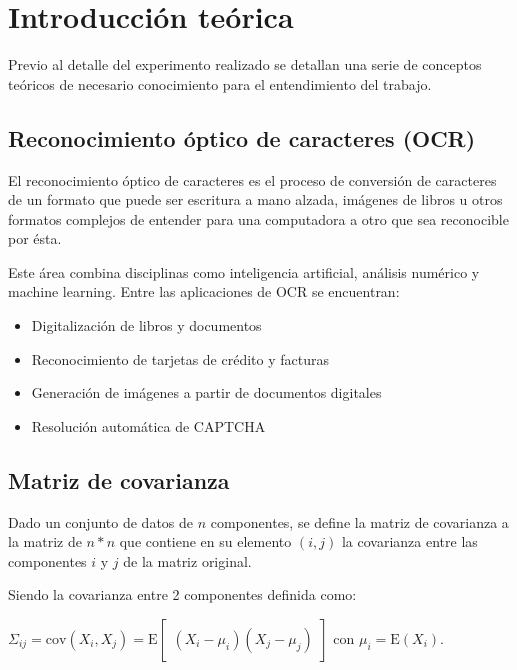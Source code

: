     \section{Introducci\'on te\'orica}

Previo al detalle del experimento realizado se detallan una serie de conceptos te\'oricos de necesario
conocimiento para el entendimiento del trabajo.

\subsection{Reconocimiento \'optico de caracteres (OCR)}

El reconocimiento \'optico de caracteres es el proceso de conversi\'on de caracteres de un formato que puede
ser escritura a mano alzada, im\'agenes de libros u otros formatos complejos de entender para una computadora
a otro que sea reconocible por \'esta.

Este \'area combina disciplinas como inteligencia artificial, an\'alisis num\'erico y machine learning. Entre
las aplicaciones de OCR se encuentran:

\begin{itemize}
  \item Digitalizaci\'on de libros y documentos
  \item Reconocimiento de tarjetas de cr\'edito y facturas
  \item Generaci\'on de im\'agenes a partir de documentos digitales
  \item Resoluci\'on autom\'atica de CAPTCHA
\end{itemize}

\subsection{Matriz de covarianza}

Dado un conjunto de datos de $n$ componentes, se define la matriz de covarianza a la matriz de $n*n$ que
contiene en su elemento $(i, j)$ la covarianza entre las componentes $i$ y $j$ de la matriz original.

Siendo la covarianza entre 2 componentes definida como:
\\

\centerline{$\Sigma_{ij} = \mathrm{cov}(X_i, X_j) = \mathrm{E}\begin{bmatrix}(X_i - \mu_i)(X_j - \mu_j) \end{bmatrix}$ con $\mu_i = \mathrm{E}(X_i)$.}

